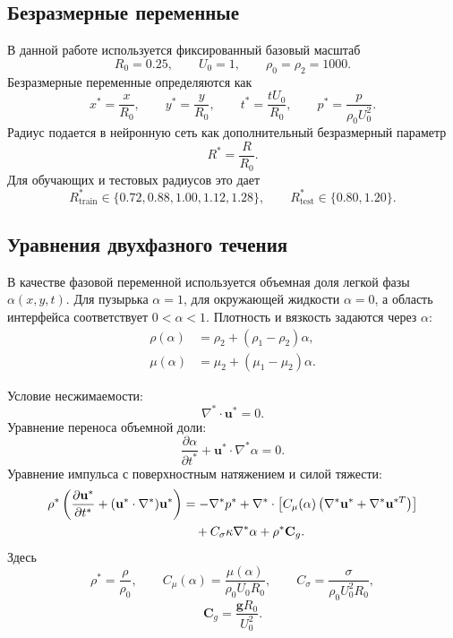 \documentclass[12pt,a4paper]{article}
\newcommand{\Rbase}{R_0}
\newcommand{\Uref}{U_0}
\newcommand{\rhoref}{\rho_0}
\begin{document}
\subsection{Безразмерные переменные}

В данной работе используется фиксированный базовый
масштаб
\[
    \Rbase=0.25,\qquad \Uref=1,\qquad \rhoref=\rho_2=1000.
\]
Безразмерные переменные определяются как
\[
    x^*=\frac{x}{\Rbase},\qquad
    y^*=\frac{y}{\Rbase},\qquad
    t^*=\frac{t\Uref}{\Rbase},\qquad
    p^*=\frac{p}{\rhoref \Uref^2}.
\]
Радиус подается в нейронную сеть как дополнительный безразмерный параметр
\[
    R^*=\frac{R}{\Rbase}.
\]
Для обучающих и тестовых радиусов это дает
\[
    R^*_{\mathrm{train}}\in\{0.72,0.88,1.00,1.12,1.28\},
    \qquad
    R^*_{\mathrm{test}}\in\{0.80,1.20\}.
\]

\subsection{Уравнения двухфазного течения}

В качестве фазовой переменной используется объемная доля легкой фазы
\(\alpha(x,y,t)\). Для пузырька \(\alpha=1\), для окружающей жидкости
\(\alpha=0\), а область интерфейса соответствует \(0<\alpha<1\).
Плотность и вязкость задаются через \(\alpha\):
\begin{align}
    \rho(\alpha) &= \rho_2 + (\rho_1-\rho_2)\alpha, \\
    \mu(\alpha) &= \mu_2 + (\mu_1-\mu_2)\alpha.
\end{align}

Условие несжимаемости:
\begin{equation}
    \nabla^*\cdot\mathbf{u}^*=0.
    \label{eq:mass}
\end{equation}
Уравнение переноса объемной доли:
\begin{equation}
    \frac{\partial\alpha}{\partial t^*}
    + \mathbf{u}^*\cdot\nabla^*\alpha=0.
    \label{eq:alpha_transport}
\end{equation}
Уравнение импульса с поверхностным натяжением и силой тяжести:
\begin{align}
    \rho^*
    \left(
        \frac{\partial\mathbf{u}^*}{\partial t^*}
        +(\mathbf{u}^*\cdot\nabla^*)\mathbf{u}^*
    \right)
    &=
    -\nabla^*p^*
    +\nabla^*\cdot
    \left[
        C_\mu(\alpha)
        \left(\nabla^*\mathbf{u}^*+\nabla^*\mathbf{u}^{*T}\right)
    \right]
    \notag\\
    &\quad
    + C_\sigma \kappa\nabla^*\alpha
    + \rho^*\mathbf{C}_g.
    \label{eq:momentum}
\end{align}
Здесь
\[
    \rho^*=\frac{\rho}{\rhoref},
    \qquad
    C_\mu(\alpha)=\frac{\mu(\alpha)}{\rhoref\Uref\Rbase},
    \qquad
    C_\sigma=\frac{\sigma}{\rhoref\Uref^2\Rbase},
\]
\[
    \mathbf{C}_g=\frac{\mathbf{g}\Rbase}{\Uref^2}.
\]
\end{document}
